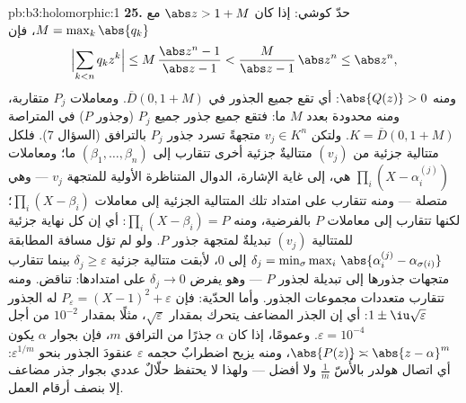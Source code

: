 \begin{solution}{pb:b3:holomorphic:1}
\textbf{25.} حدّ كوشي: إذا كان $\abs z > 1 + M$ مع $M =
\max_k\abs{q_k}$،
فإن
\[
\Bigl|\sum_{k<n}q_kz^k\Bigr|
\leq M\,\frac{\abs z^n - 1}{\abs z - 1}
< \frac{M}{\abs z - 1}\,\abs z^n \leq \abs z^n,
\]
ومنه $\abs{Q(z)} > 0$: أي تقع جميع الجذور في $\overline D(0, 1+M)$. ومعاملات
$P_j$ متقاربة، ومنه محدودة بعدد $M$ ما: فتقع جميع جذور جميع
$P_j$ (وجذور $P$) في المتراصة $K = \overline D(0, 1 + M)$. ولتكن $v_j \in K^n$
متجهةً تسرد جذور $P_j$ بالترافق (السؤال 7). فلكل متتالية جزئية
من $(v_j)$ متتاليةٌ جزئية أخرى تتقارب إلى $(\beta_1, \dots, \beta_n)$ ما؛ ومعاملات
$\prod_i(X - \alpha_i^{(j)})$ هي، إلى غاية الإشارة، الدوال المتناظرة الأولية للمتجهة
$v_j$ --- وهي متصلة --- ومنه تتقارب على امتداد تلك المتتالية
الجزئية إلى معاملات $\prod_i(X - \beta_i)$؛ لكنها تتقارب إلى معاملات $P$
بالفرضية، ومنه $\prod_i(X -
\beta_i) = P$: أي إن كل نهاية جزئية للمتتالية $(v_j)$
تبديلةٌ لمتجهة جذور $P$. ولو لم تؤل مسافة المطابقة $\delta_j = \min_\sigma\max_i\,
\abs{\alpha_i^{(j)} - \alpha_{\sigma(i)}}$ إلى
$0$، لأبقت متتالية جزئية $\delta_j \geq \varepsilon$ بينما تتقارب متجهات جذورها إلى
تبديلة لجذور $P$ --- وهو يفرض $\delta_j \to 0$ على امتدادها:
تناقض. ومنه تتقارب متعددات مجموعات الجذور. وأما الحدّية: فإن
$P_\varepsilon = (X - 1)^2 + \varepsilon$ له الجذور $1 \pm
\iu\sqrt\varepsilon$: أي إن الجذر المضاعف يتحرك بمقدار
$\sqrt\varepsilon$، مثلًا بمقدار $10^{-2}$ من أجل $\varepsilon =
10^{-4}$. وعمومًا، إذا
كان $\alpha$ جذرًا من الترافق $m$، فإن بجوار $\alpha$ يكون $\abs{P(z)} \asymp \abs{z -
\alpha}^m$، ومنه
يزيح اضطرابٌ حجمه $\varepsilon$ عنقودَ الجذور بنحو $\varepsilon^{1/m}$: أي
اتصال هولدر بالأُسّ $\frac1m$ ولا أفضل --- ولهذا لا يحتفظ حلّالٌ
عددي بجوار جذر مضاعف إلا بنصف أرقام العمل.
\end{solution}
